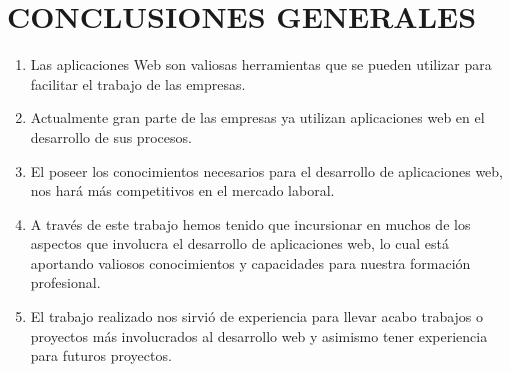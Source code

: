 \chapter*{CONCLUSIONES GENERALES} 
{
	\fontsize{12pt}{10mm}\selectfont
	\begin{enumerate}
		\item Las aplicaciones Web son valiosas herramientas que se pueden utilizar para facilitar el trabajo de las empresas.
		\vspace{6mm}
		
		\item Actualmente gran parte de las empresas ya utilizan aplicaciones web en el desarrollo de sus procesos.
		\vspace{6mm}
		
		\item El poseer los conocimientos necesarios para el desarrollo de aplicaciones web, nos hará más competitivos en el mercado laboral.
		\vspace{6mm}
		
		\item A través de este trabajo hemos tenido que incursionar en muchos de los aspectos que involucra el desarrollo de aplicaciones web, lo cual está aportando valiosos conocimientos y capacidades para nuestra formación profesional.
		\vspace{6mm}
		
		\item El trabajo realizado nos sirvió de experiencia para llevar acabo trabajos o proyectos más involucrados al desarrollo web y asimismo tener experiencia para futuros proyectos.   
  
		\vspace{6mm}
	\end{enumerate}
}
